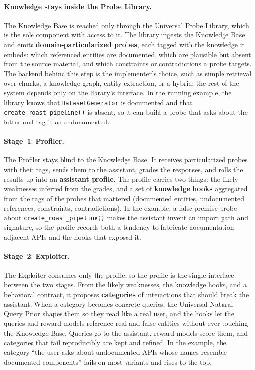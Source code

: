 \documentclass[11pt,a4paper]{article}
\begin{document}
\paragraph{Knowledge stays inside the Probe Library.}
The Knowledge Base is reached only through the Universal Probe Library, which is
the sole component with access to it. The library ingests the Knowledge Base and
emits \textbf{domain-particularized probes}, each tagged with the knowledge it
embeds: which referenced entities are documented, which are plausible but absent
from the source material, and which constraints or contradictions a probe targets. The
backend behind this step is the implementer's choice, such as simple retrieval
over chunks, a knowledge graph, entity extraction, or a hybrid; the rest of the
system depends only on the library's interface. In the running example, the
library knows that \texttt{DatasetGenerator} is documented and that
\texttt{create\_roast\_pipeline()} is absent, so it can build a probe that asks
about the latter and tag it as undocumented.

\paragraph{Stage~1: Profiler.}
The Profiler stays blind to the Knowledge Base. It receives particularized probes
with their tags, sends them to the assistant, grades the responses, and rolls the
results up into an \textbf{assistant profile}. The profile carries two things:
the likely weaknesses inferred from the grades, and a set of \textbf{knowledge
hooks} aggregated from the tags of the probes that mattered (documented entities,
undocumented references, constraints, contradictions). In the example, a
false-premise probe about \texttt{create\_roast\_pipeline()} makes the assistant
invent an import path and signature, so the profile records both a tendency to
fabricate documentation-adjacent APIs and the hooks that exposed it.

\paragraph{Stage~2: Exploiter.}
The Exploiter consumes only the profile, so the profile is the single interface
between the two stages. From the likely weaknesses, the knowledge hooks, and a
behavioral contract, it proposes \textbf{categories} of interactions that should
break the assistant. When a category becomes concrete queries, the Universal
Natural Query Prior shapes them so they read like a real user, and the hooks let
the queries and reward models reference real and false entities without ever
touching the Knowledge Base. Queries go to the assistant, reward models score
them, and categories that fail reproducibly are kept and refined. In the example,
the category ``the user asks about undocumented APIs whose names resemble
documented components'' fails on most variants and rises to the top.
\end{document}
